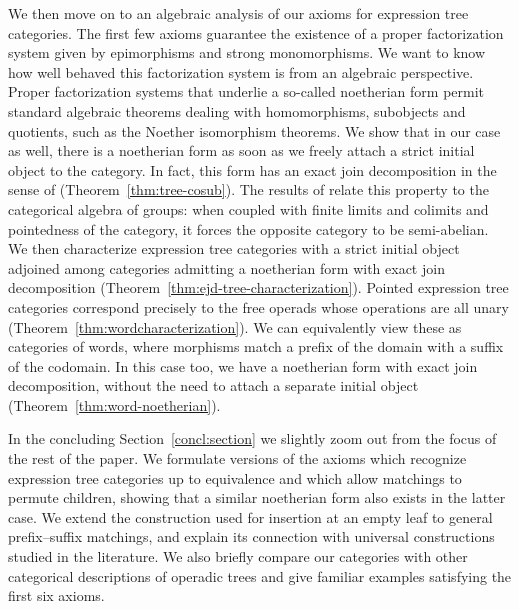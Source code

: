 \documentclass[11pt,a4paper]{article}
\theoremstyle{plain}
\theoremstyle{definition}
\theoremstyle{remark}
\begin{document}
We then move on to an algebraic analysis of our axioms for expression tree categories. The first few axioms guarantee the existence of a proper factorization system given by epimorphisms and strong monomorphisms. We want to know how well behaved this factorization system is from an algebraic perspective. Proper factorization systems that underlie a so-called noetherian form permit standard algebraic theorems dealing with homomorphisms, subobjects and quotients, such as the Noether isomorphism theorems. We show that in our case as well, there is a noetherian form as soon as we freely attach a strict initial object to the category. In fact, this form has an exact join decomposition in the sense of \cite{JanelidzeVanNiekerk} (Theorem~\ref{thm:tree-cosub}). The results of \cite{JanelidzeVanNiekerk} relate this property to the categorical algebra of groups: when coupled with finite limits and colimits and pointedness of the category, it forces the opposite category to be semi-abelian. We then characterize expression tree categories with a strict initial object adjoined among categories admitting a noetherian form with exact join decomposition (Theorem~\ref{thm:ejd-tree-characterization}). Pointed expression tree categories correspond precisely to the free operads whose operations are all unary (Theorem~\ref{thm:wordcharacterization}). We can equivalently view these as categories of words, where morphisms match a prefix of the domain with a suffix of the codomain. In this case too, we have a noetherian form with exact join decomposition, without the need to attach a separate initial object (Theorem~\ref{thm:word-noetherian}).

In the concluding Section~\ref{concl:section} we slightly zoom out from the focus of the rest of the paper. We formulate versions of the axioms
which recognize expression tree categories up to equivalence and
which allow matchings to permute children, showing that a similar
noetherian form also exists in the latter case. We extend the
construction used for insertion at an empty leaf to general
prefix--suffix matchings, and explain its connection with universal
constructions studied in the literature. We also briefly compare our
categories with other categorical descriptions of operadic trees
and give familiar examples satisfying the first six axioms.
\end{document}
